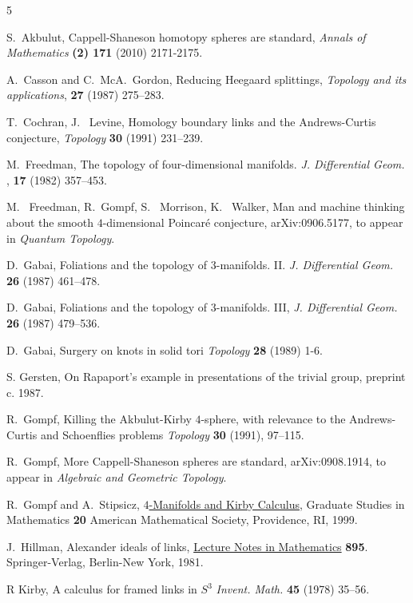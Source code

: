 \documentclass{amsart}
\begin{document}
\begin{thebibliography}{5}

 S.~Akbulut, Cappell-Shaneson homotopy spheres are standard, {\em Annals of Mathematics} {\bf (2) 171} (2010) 2171-2175.

 A.~Casson and C.~McA.~Gordon, Reducing Heegaard splittings,  {\em Topology  and its applications}, {\bf 27} (1987) 275--283.

 T.~Cochran, J.~ Levine,  Homology boundary links and the Andrews-Curtis conjecture, {\em Topology} {\bf 30} (1991) 231--239.

  M.~Freedman, The topology of four-dimensional manifolds.   {\em J. Differential Geom.  }, {\bf 17}  (1982) 357--453.

 M.~ Freedman,  R.~Gompf, S.~ Morrison, K.~ Walker,  Man and machine thinking about the smooth $4$-dimensional Poincar\'e conjecture, arXiv:0906.5177, to appear in {\em Quantum Topology}.

 D.~Gabai, Foliations and the topology of $3$-manifolds. II. {\em J. Differential Geom.} {\bf 26} (1987) 461--478.

 D.~Gabai, Foliations and the topology of $3$-manifolds. III, {\em J. Differential Geom.} {\bf 26} (1987) 479--536.

 D.~Gabai,  Surgery on knots in solid tori {\em Topology} {\bf 28} (1989) 1-6.

 S. Gersten,  On Rapaport's example in presentations of the trivial group, preprint c. 1987.

 R.~Gompf, Killing the Akbulut-Kirby $4$-sphere, with relevance to the Andrews-Curtis and Schoenflies problems {\em Topology}  {\bf 30}  (1991),  97--115.

 R.~Gompf, More Cappell-Shaneson spheres are standard, arXiv:0908.1914, to appear in {\em Algebraic and Geometric Topology}.

 R.~Gompf and A.~Stipsicz, \underline{$4$-Manifolds and Kirby Calculus}, Graduate Studies in Mathematics {\bf 20} American Mathematical Society, Providence, RI, 1999.

 J.~Hillman, Alexander ideals of links, \underline{Lecture Notes in Mathematics} {\bf 895}. Springer-Verlag, Berlin-New York, 1981.

 R Kirby, A calculus for framed links in $S^3$ {\em Invent. Math.} {\bf 45} (1978) 35--56.


\end{thebibliography}
\end{document}
